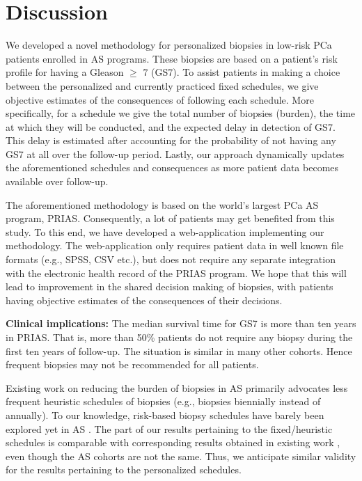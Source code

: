 \section{Discussion}
We developed a novel methodology for personalized biopsies in low-risk PCa patients enrolled in AS programs. These biopsies are based on a patient's risk profile for having a Gleason $\geq$ 7 (GS7). To assist patients in making a choice between the personalized and currently practiced fixed schedules, we give objective estimates of the consequences of following each schedule. More specifically, for a schedule we give the total number of biopsies (burden), the time at which they will be conducted, and the expected delay in detection of GS7. This delay is estimated after accounting for the probability of not having any GS7 at all over the follow-up period. Lastly, our approach dynamically updates the aforementioned schedules and consequences as more patient data becomes available over follow-up.

The aforementioned methodology is based on the world's largest PCa AS program, PRIAS. Consequently, a lot of patients may get benefited from this study. To this end, we have developed a web-application implementing our methodology. The web-application only requires patient data in well known file formats (e.g., SPSS, CSV etc.), but does not require any separate integration with the electronic health record of the PRIAS program. We hope that this will lead to improvement in the shared decision making of biopsies, with patients having objective estimates of the consequences of their decisions. 

\textbf{Clinical implications:} The median survival time for GS7 is more than ten years in PRIAS. That is, more than 50\% patients do not require any biopsy during the first ten years of follow-up. The situation is similar in many other cohorts. Hence frequent biopsies may not be recommended for all patients.

Existing work on reducing the burden of biopsies in AS primarily advocates less frequent heuristic schedules of biopsies \citep{inoue2018comparative} (e.g., biopsies biennially instead of annually). To our knowledge, risk-based biopsy schedules have barely been explored yet in AS \citep{nieboer2018active,bruinsma2016active}. The part of our results pertaining to the fixed/heuristic schedules is comparable with corresponding results obtained in existing work \citep{inoue2018comparative}, even though the AS cohorts are not the same. Thus, we anticipate similar validity for the results pertaining to the personalized schedules.

